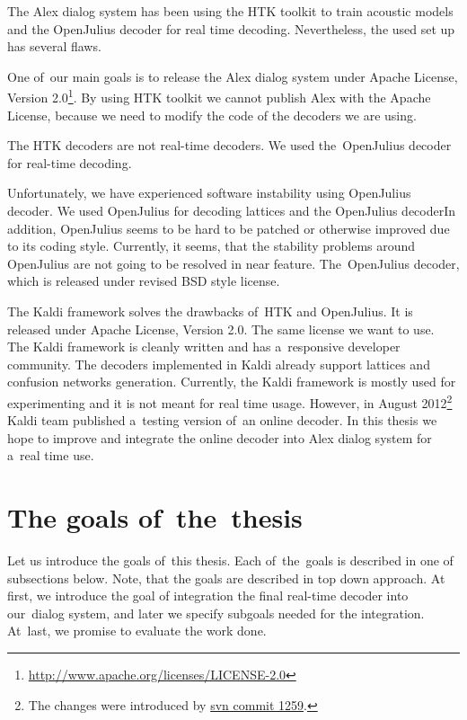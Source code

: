 The Alex dialog system has been using the \ac{HTK} toolkit\cite{young94htk} to train acoustic models and the OpenJulius\cite{lee2009julius} decoder for real time decoding. Nevertheless, the used set up has several flaws.

One of~our main goals is to release the Alex dialog system under Apache License, Version 2.0\footnote{\url{http://www.apache.org/licenses/LICENSE-2.0}}. By using \ac{HTK} toolkit we cannot publish Alex with the Apache License, because we need to modify the code of the decoders we are using. 

The \ac{HTK} decoders are not real-time decoders\cite{yao2010practical}. We used the~OpenJulius decoder for real-time decoding.

Unfortunately, we have experienced software instability using OpenJulius decoder. We used OpenJulius for decoding lattices and the OpenJulius decoderIn addition, OpenJulius seems to be hard to be patched or otherwise improved due to its coding style. Currently, it seems, that the stability problems around OpenJulius are not going to be resolved in near feature.
The~OpenJulius decoder, which is released under revised BSD style license.

The Kaldi\cite{povey2011kaldi} framework solves the drawbacks of~\ac{HTK} and OpenJulius. It is released under Apache License, Version 2.0. The same license we want to use. The Kaldi framework is cleanly written and has a~responsive developer community. The decoders implemented in Kaldi already support lattices and confusion networks generation. Currently, the Kaldi framework is mostly used for experimenting and it is not meant for real time usage. However, in August 2012\footnote{The changes were introduced by \href{https://sourceforge.net/p/kaldi/code/1259/}{svn commit 1259}.} Kaldi team published a~testing version of~an online decoder. In this thesis we hope to improve and integrate the online decoder into Alex dialog system for a~real time use.


\section{The goals of~the~thesis} 
\label{sec:goals}
Let us introduce the goals of~this thesis. Each of~the~goals is described in one of subsections below. Note, that the goals are described in top down approach.
At first, we introduce the goal of integration the final real-time decoder into our~dialog system, and later we specify subgoals needed for the integration.
At~last, we promise to evaluate the work done.

